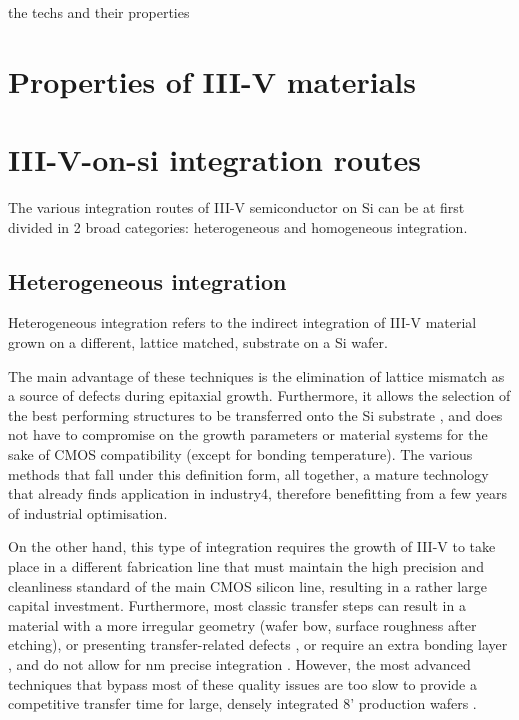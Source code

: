 the techs and their properties











\section{Properties of III-V materials}
\section{\texorpdfstring{III-V-on-\acs{si} integration routes}{III-V-on-Si integration routes}}
The various integration routes of III-V semiconductor on Si can be at first divided in 2 broad categories: heterogeneous and homogeneous integration.
\subsection{Heterogeneous integration}
Heterogeneous integration refers to the indirect integration of III-V material grown on a different, lattice matched, substrate on a Si wafer. 
\par
The main advantage of these techniques is the elimination of lattice mismatch as a source of defects during epitaxial growth. Furthermore, it allows the selection of the best performing structures to be transferred onto the Si substrate \cite{Zadeh2016, Wang2017}, and does not have to compromise on the growth parameters or material systems for the sake of CMOS compatibility (except for bonding temperature). The various methods that fall under this definition form, all together, a mature technology that already finds application in industry4, therefore benefitting from a few years of industrial optimisation.
\par
On the other hand, this type of integration requires the growth of III-V to take place in a different fabrication line that must maintain the high precision and cleanliness standard of the main CMOS silicon line, resulting in a rather large capital investment. Furthermore, most classic transfer steps can result in a material with a more irregular geometry (wafer bow, surface roughness after etching), or presenting transfer-related defects \cite{Jevtics2022}, or require an extra bonding layer \cite{Jevtics2022, Tang2019}, and do not allow for nm precise integration \cite{Wang2017, McPhillimy2020}. However, the most advanced techniques that bypass most of these quality issues are too slow to provide a competitive transfer time for large, densely integrated 8' production wafers \cite{Wang2017, McPhillimy2020}.
